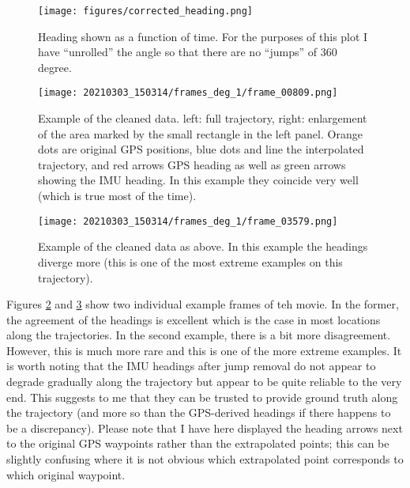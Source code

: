 \documentclass[a4]{article}
\begin{document}
\begin{figure}\begin{center}
  \texttt{[image: figures/corrected\_heading.png]}
  \caption{\label{fig:correctHeading} Heading
  shown as a function of time. For the purposes of this plot I have
  ``unrolled'' the angle so that there are no ``jumps'' of 360 degree.}  
\end{center}\end{figure}

\begin{figure}\begin{center}
  \texttt{[image: 20210303\_150314/frames\_deg\_1/frame\_00809.png]}
  \caption{\label{fig:frameEx1} Example of the cleaned data. left:
    full trajectory, right: enlargement of the area marked by the
    small rectangle in the left panel. Orange dots are original GPS
    positions, blue dots and line the interpolated trajectory, and red
    arrows GPS heading as well as green arrows showing the IMU
    heading. In this example they coincide very well (which is true
    most of the time).}
\end{center}\end{figure}

\begin{figure}\begin{center}
  \texttt{[image: 20210303\_150314/frames\_deg\_1/frame\_03579.png]}
  \caption{\label{fig:frameEx2} Example of the cleaned data as
    above. In this example the headings diverge more (this is one of
    the most extreme examples on this trajectory).}
\end{center}\end{figure}

Figures \ref{fig:frameEx1} and \ref{fig:frameEx2} show two individual
example frames of teh movie. In the former, the agreement of the headings is
excellent which is the case in most locations along the
trajectories. In the second example, there is a bit more
disagreement. However, this is much more rare and this is one of the
more extreme examples. It is worth noting that the IMU headings
after jump removal do not appear to degrade gradually along the
trajectory but appear to be quite reliable to the very end. This
suggests to me that they can be trusted to provide ground truth
along the trajectory (and more so than the GPS-derived headings
if there happens to be a discrepancy). Please note that I have here
displayed the heading arrows next to the original GPS waypoints
rather than the extrapolated points; this can be slightly confusing
where it is not obvious which extrapolated point corresponds to
which original waypoint.
\end{document}
